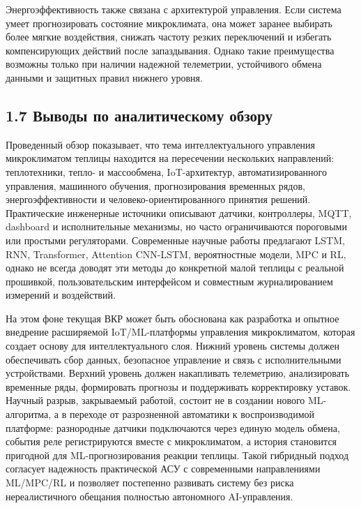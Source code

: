 \documentclass[a4paper,14pt]{extarticle}
\begin{document}
Энергоэффективность также связана с архитектурой управления. Если
система умеет прогнозировать состояние микроклимата, она может заранее
выбирать более мягкие воздействия, снижать частоту резких переключений и
избегать компенсирующих действий после запаздывания. Однако такие
преимущества возможны только при наличии надежной телеметрии,
устойчивого обмена данными и защитных правил нижнего уровня.

\hypertarget{ux432ux44bux432ux43eux434ux44b-ux43fux43e-ux430ux43dux430ux43bux438ux442ux438ux447ux435ux441ux43aux43eux43cux443-ux43eux431ux437ux43eux440ux443}{%
\subsection{1.7 Выводы по аналитическому
обзору}\label{ux432ux44bux432ux43eux434ux44b-ux43fux43e-ux430ux43dux430ux43bux438ux442ux438ux447ux435ux441ux43aux43eux43cux443-ux43eux431ux437ux43eux440ux443}}

Проведенный обзор показывает, что тема интеллектуального управления
микроклиматом теплицы находится на пересечении нескольких направлений:
теплотехники, тепло- и массообмена, IoT-архитектур, автоматизированного
управления, машинного обучения, прогнозирования временных рядов,
энергоэффективности и человеко-ориентированного принятия решений.
Практические инженерные источники описывают датчики, контроллеры, MQTT,
dashboard и исполнительные механизмы, но часто ограничиваются пороговыми
или простыми регуляторами. Современные научные работы предлагают LSTM,
RNN, Transformer, Attention CNN-LSTM, вероятностные модели, MPC и RL,
однако не всегда доводят эти методы до конкретной малой теплицы с
реальной прошивкой, пользовательским интерфейсом и совместным
журналированием измерений и воздействий.

На этом фоне текущая ВКР может быть обоснована как разработка и опытное
внедрение расширяемой IoT/ML-платформы управления микроклиматом, которая
создает основу для интеллектуального слоя. Нижний уровень системы должен
обеспечивать сбор данных, безопасное управление и связь с
исполнительными устройствами. Верхний уровень должен накапливать
телеметрию, анализировать временные ряды, формировать прогнозы и
поддерживать корректировку уставок. Научный разрыв, закрываемый работой,
состоит не в создании нового ML-алгоритма, а в переходе от разрозненной
автоматики к воспроизводимой платформе: разнородные датчики подключаются
через единую модель обмена, события реле регистрируются вместе с
микроклиматом, а история становится пригодной для ML-прогнозирования
реакции теплицы. Такой гибридный подход согласует надежность
практической АСУ с современными направлениями ML/MPC/RL и позволяет
постепенно развивать систему без риска нереалистичного обещания
полностью автономного AI-управления.
\end{document}

